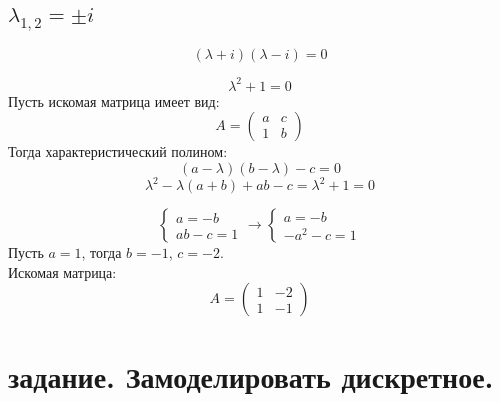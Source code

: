 \documentclass[a5paper, 10pt]{article}
\theoremstyle{definition}
\theoremstyle{plain}
\theoremstyle{remark}
\begin{document}
\subsection{$\lambda_{1, 2} = \pm i$}

\begin{equation}
\left( \lambda +  i \right)\left( \lambda - i \right)=0
\end{equation}

\begin{equation}
\lambda^2 +  1 =0
\end{equation}
Пусть искомая матрица имеет вид:
\begin{equation}
A =
\begin{pmatrix}
a & c \\
1 & b
\end{pmatrix}
\end{equation}
Тогда характеристический полином:
\begin{equation}
\left( a - \lambda \right) \left( b - \lambda \right) - c = 0
\end{equation}
\begin{equation}
\lambda^ 2 - \lambda (a + b ) + ab - c = \lambda^2 +  1 =0
\end{equation}

\begin{equation}
\begin{cases}
a = -b\\
ab - c = 1
\end{cases}
\to
\begin{cases}
a = -b\\
-a^2 - c = 1
\end{cases}
\end{equation}
Пусть $ a = 1$, тогда $b = -1$, $c = -2$.\\
Искомая матрица:
\begin{equation}
A =
\begin{pmatrix}
1 & -2 \\
1 & -1
\end{pmatrix}
\end{equation}

\newpage
\section{задание. Замоделировать дискретное.}
\end{document}
